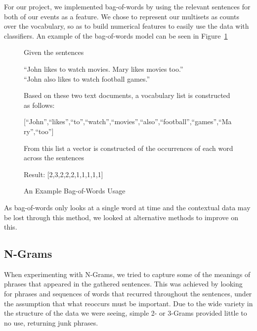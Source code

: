 \documentclass[bsc,frontabs,twoside,singlespacing,parskip,deptreport]{infthesis}     %
\begin{document}
For our project, we implemented bag-of-words by using the relevant sentences for both of our events as a feature.
We chose to represent our multisets as counts over the vocabulary, so as to build numerical features to easily
use the data with classifiers. An example of the bag-of-words model can be seen in Figure~\ref{fig:bow}
\begin{figure}[H]
\begin{tcolorbox}[width=\textwidth,
                  interior hidden,
                  boxsep=10pt,
                  left=0pt,
                  right=0pt,
                  top=2pt,
                  ]%
  Given the sentences \vspace{0.5em}\\
  \begin{center}``John likes to watch movies. Mary likes movies too.''\\
  ``John also likes to watch football games.''\vspace{1em}\\
   \end{center}
    Based on these two text documents, a vocabulary list is constructed as follows:\vspace{1em}\\
    \begin{center}
  [``John'',``likes'',``to'',``watch'',``movies'',``also'',``football'',``games'',``Mary'',``too'']\vspace{1em}\\
\end{center}
    From this list a vector is constructed of the occurrences
    of each word across the sentences\vspace{1em}\\
 \begin{center} 
  Result: [2,3,2,2,2,1,1,1,1,1]
\end{center}
\end{tcolorbox}
\caption{An Example Bag-of-Words Usage}
\label{fig:bow}
\end{figure}

As bag-of-words only looks at a single word at time and the contextual data may be lost through this method, we looked at
alternative methods to improve on this.

\subsection{N-Grams}
When experimenting with N-Grams, we tried to capture some of the meanings of phrases that appeared in the gathered
sentences.
This was achieved by looking for phrases and sequences of words that recurred throughout the sentences, under the assumption
that what reoccurs must be important. Due to the wide variety in the structure of the data we were seeing,
simple 2- or 3-Grams provided little to no use, returning junk phrases.
\end{document}
